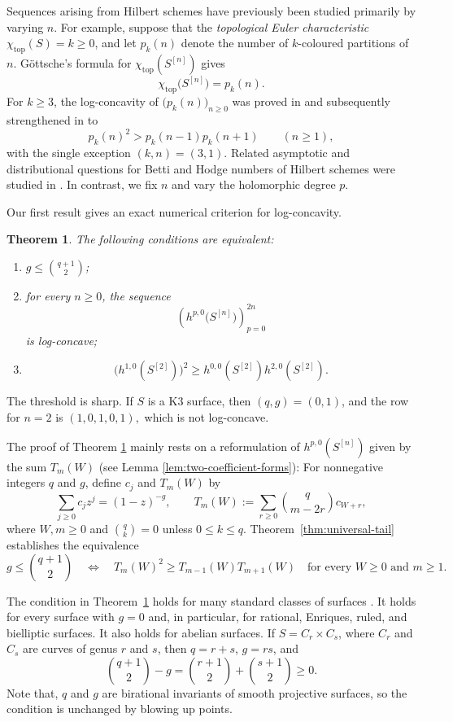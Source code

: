 \documentclass[12pt]{amsart}
\theoremstyle{plain}
\newtheorem{theorem}{Theorem}[section]
\theoremstyle{definition}
\theoremstyle{remark}
\begin{document}
Sequences arising from Hilbert schemes have previously been studied
primarily by varying \(n\).  For example, suppose that the \emph{topological Euler characteristic}
\(\chi_{\mathrm{top}}(S)=k\ge0\), and let \(p_k(n)\) denote the number
of \(k\)-coloured partitions of \(n\).  G\"ottsche's formula for $\chi_{\mathrm{top}}(S^{[n]})$ \cite[Theorem 0.1 (2)]{Gottsche} gives
\[
 \chi_{\mathrm{top}}\bigl(S^{[n]}\bigr)
 =
 p_k(n).
\]
For \(k\ge3\), the log-concavity of \(\bigl(p_k(n)\bigr)_{n\ge0}\) was
proved in \cite{Bringmann1} and subsequently strengthened in
\cite{Bringmann2} to
\[
 p_k(n)^2>p_k(n-1)p_k(n+1)
 \qquad(n\ge1),
\]
with the single exception \((k,n)=(3,1)\).  Related asymptotic and
distributional questions for Betti and Hodge numbers of Hilbert
schemes were studied in
\cite{BringmannManschot,ManschotZapataRolon,GillmanEtAl}.  In contrast,
we fix \(n\) and vary the holomorphic degree \(p\).

Our first result gives an exact numerical criterion for log-concavity.

\begin{theorem}\label{thm:main-hodge}
The following conditions are equivalent:
\begin{enumerate}[label=\textup{(\roman*)}]
\item \(g\le\binom{q+1}{2}\);
\item for every \(n\ge0\), the sequence
      \[
       \left(h^{p,0}\bigl(S^{[n]}\bigr)\right)_{p=0}^{2n}
      \]
      is log-concave;
\item
      \[
       \bigl(h^{1,0}(S^{[2]})\bigr)^2
       \ge
       h^{0,0}(S^{[2]})h^{2,0}(S^{[2]}).
      \]
\end{enumerate}
\end{theorem}
The threshold is sharp.  If \(S\) is a K3 surface, then \((q,g)=(0,1)\), and the row for \(n=2\) is $(1,0,1,0,1),$ which is not log-concave. 

The proof of Theorem \ref{thm:main-hodge} mainly rests on a reformulation of $h^{p,0}(S^{[n]})$ given by the sum $T_m(W)$ (see Lemma \ref{lem:two-coefficient-forms}): For nonnegative integers \(q\) and \(g\),
define \(c_j\) and \(T_m(W)\) by
\[
 \sum_{j\ge0}c_jz^j=(1-z)^{-g},
 \qquad
 T_m(W):=\sum_{r\ge0}\binom q{m-2r}c_{W+r},
\]
where \(W,m\ge0\) and
\(\binom qk=0\) unless \(0\le k\le q\).
Theorem~\ref{thm:universal-tail} establishes the equivalence
\[
 g\le\binom{q+1}{2}
 \quad\Longleftrightarrow\quad
 T_m(W)^2\ge T_{m-1}(W)T_{m+1}(W)
 \quad\text{for every }W\ge0\text{ and }m\ge1.
\]

The condition in Theorem~\ref{thm:main-hodge} holds for many standard
classes of surfaces \cite{BHPV}.  It holds for every surface with
\(g=0\) and, in particular, for rational, Enriques, ruled, and
bielliptic surfaces.  It also holds for abelian surfaces.  If
\(S=C_r\times C_s\), where \(C_r\) and \(C_s\) are curves of genus
\(r\) and \(s\), then \(q=r+s\), \(g=rs\), and
\[
 \binom{q+1}{2}-g
 =
 \binom{r+1}{2}+\binom{s+1}{2}
 \ge0.
\]
Note that, \(q\) and \(g\) are birational invariants of smooth projective surfaces, so the condition is unchanged by blowing up points.
\end{document}
